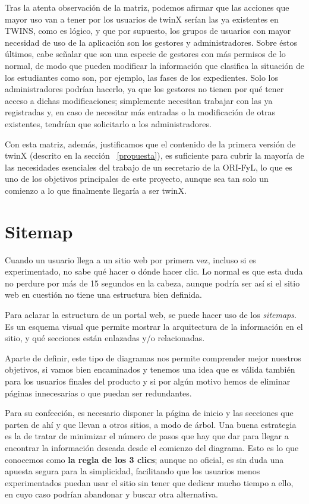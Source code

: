 Tras la atenta observación de la matriz, podemos afirmar que las acciones que mayor uso van a tener por los usuarios de twinX serían las ya existentes en TWINS, como es lógico, y que por supuesto, los grupos de usuarios con mayor necesidad de uso de la aplicación son los gestores y administradores. Sobre éstos últimos, cabe señalar que son una especie de gestores con más permisos de lo normal, de modo que pueden modificar la información que clasifica la situación de los estudiantes como son, por ejemplo, las fases de los expedientes. Solo los administradores podrían hacerlo, ya que los gestores no tienen por qué tener acceso a dichas modificaciones; simplemente necesitan trabajar con las ya registradas y, en caso de necesitar más entradas o la modificación de otras existentes, tendrían que solicitarlo a los administradores.

Con esta matriz, además, justificamos que el contenido de la primera versión de twinX (descrito en la sección ~\ref{propuesta}), es suficiente para cubrir la mayoría de las necesidades esenciales del trabajo de un secretario de la ORI-FyL, lo que es uno de los objetivos principales de este proyecto, aunque sea tan solo un comienzo a lo que finalmente llegaría a ser twinX.

\section{Sitemap}

Cuando un usuario llega a un sitio web por primera vez, incluso si es experimentado, no sabe qué hacer o dónde hacer clic. Lo normal es que esta duda no perdure por más de 15 segundos en la cabeza, aunque podría ser así si el sitio web en cuestión no tiene una estructura bien definida.

Para aclarar la estructura de un portal web, se puede hacer uso de los \textit{sitemaps}. Es un esquema visual que permite mostrar la arquitectura de la información en el sitio, y qué secciones están enlazadas y/o relacionadas.

Aparte de definir, este tipo de diagramas nos permite comprender mejor nuestros objetivos, si vamos bien encaminados y tenemos una idea que es válida también para los usuarios finales del producto y si por algún motivo hemos de eliminar páginas innecesarias o que puedan ser redundantes.

Para su confección, es necesario disponer la página de inicio y las secciones que parten de ahí y que llevan a otros sitios, a modo de árbol. Una buena estrategia es la de tratar de minimizar el número de pasos que hay que dar para llegar a encontrar la información deseada desde el comienzo del diagrama. Esto es lo que conocemos como \textbf{la regla de los 3 clics}; aunque no oficial, es sin duda una apuesta segura para la simplicidad, facilitando que los usuarios menos experimentados puedan usar el sitio sin tener que dedicar mucho tiempo a ello, en cuyo caso podrían abandonar y buscar otra alternativa. \cite{sitemap}

